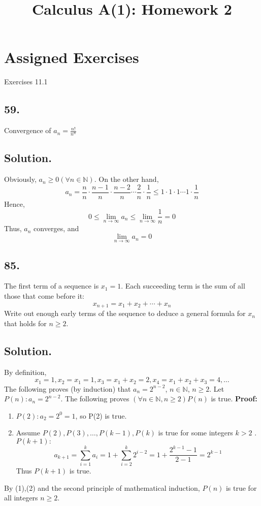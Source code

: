 \documentclass{article}
\title{Calculus A(1): Homework 2}
\begin{document}
\maketitle

\section*{Assigned Exercises}
Exercises 11.1
\subsection*{59.} 
Convergence of $a_n = \frac{n!}{n^n}$
\subsection*{Solution.}
Obviously, $a_n \geq 0  (\forall n \in \mathbb{N})$.\newline
On the other hand, 
\[a_n=\frac{n}{n}\cdot\frac{n-1}{n}\cdot\frac{n-2}{n}\cdots\frac{2}{n}\cdot\frac{1}{n}\leq 1\cdot1\cdot1\cdots1\cdot\frac{1}{n}\]
Hence,
\[0\leq\lim_{n\to\infty} a_n \leq\lim_{n\to\infty} \frac{1}{n}=0\]
Thus, $a_n$ converges, and \[\lim _{n\to\infty} a_n=0\]
\subsection*{85.}
The first term of a sequence is $x_1=1$. Each succeeding term is the sum of all those that come before it:
\[x_{n+1}=x_1+x_2+\cdots+x_n\]
Write out enough early terms of the sequence to deduce a general formula for $x_n$ that holds for 
 $n\geq 2$.
\subsection*{Solution.}
By definition,
\[x_1=1,x_2=x_1=1,x_3=x_1+x_2=2,x_4=x_1+x_2+x_3=4,\dots\]
The following proves (by induction) that $a_n=2^{n-2}$, $n\in\mathbb{N}$, $n\geq2$.\newline
Let $P(n):a_n=2^{n-2}$. The following proves $(\forall n\in \mathbb{N},n\geq2)P(n)$ is true.\newline\newline
\textbf{Proof:}
\begin{enumerate}
    \item $P(2): a_2=2^0=1$, so P(2) is true.
    \item Assume $P(2),P(3),\dots ,P(k-1),P(k)$ is true for some integers $k>2$ .\newline
$P(k+1):$ \[a_{k+1}=\sum_{i=1}^k a_i=1+\sum_{i=2}^k 2^{i-2}=1+\frac{2^{k-1}-1}{2-1}=2^{k-1}\]
Thus $P(k+1)$ is true.
\end{enumerate}
By (1),(2) and the second principle of mathematical induction, $P(n)$ is true for all integers $n\geq2$.
\end{document}
